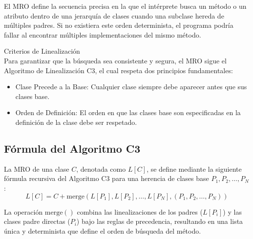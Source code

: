 \documentclass{article}
\begin{document}
El MRO define la secuencia precisa en la que el intérprete busca un método o un atributo dentro de una jerarquía de clases cuando una subclase hereda de múltiples padres. Si no existiera este orden determinista, el programa podría fallar al encontrar múltiples implementaciones del mismo método.

\vspace{1.0em}

\large{Criterios de Linealización}
\\
Para garantizar que la búsqueda sea consistente y segura, el MRO sigue el Algoritmo de Linealización C3, el cual respeta dos principios fundamentales:

\begin{itemize}
    \item {Clase Precede a la Base:} Cualquier clase siempre debe aparecer antes que sus clases base.
    \item {Orden de Definición:} El orden en que las clases base son especificadas en la definición de la clase debe ser respetado.
\end{itemize}

\subsection{Fórmula del Algoritmo C3}
La MRO de una clase $C$, denotada como $L[C]$, se define mediante la siguiente fórmula recursiva del Algoritmo C3 para una herencia de clases base $P_1, P_2, \dots, P_N$:
\begin{equation}
L[C] = C + \text{merge}(L[P_1], L[P_2], \dots, L[P_N], (P_1, P_2, \dots, P_N))
\label{eq:mro_c3}
\end{equation}

La operación $\text{merge}()$ combina las linealizaciones de los padres ($L[P_i]$) y las clases padre directas ($P_i$) bajo las reglas de precedencia, resultando en una lista única y determinista que define el orden de búsqueda del método.
\end{document}
